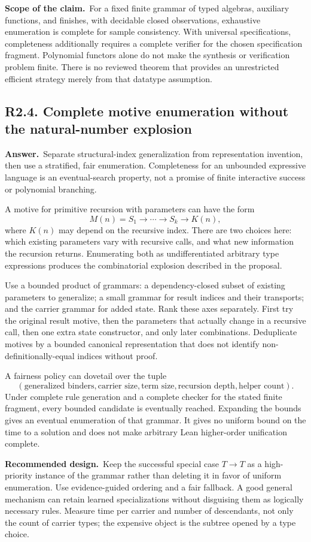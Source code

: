\documentclass[11pt,a4paper]{article}
\newcommand{\qid}[3]{\subsection{#2. #3}\label{#1}}
\newcommand{\answer}{\noindent\textbf{Answer.}\ }
\newcommand{\proposal}{\noindent\textbf{Recommended design.}\ }
\newcommand{\scope}{\noindent\textbf{Scope of the claim.}\ }
\theoremstyle{remark}
\begin{document}
\scope For a fixed finite grammar of typed algebras, auxiliary functions, and finishes, with decidable closed observations, exhaustive enumeration is complete for sample consistency. With universal specifications, completeness additionally requires a complete verifier for the chosen specification fragment. Polynomial functors alone do not make the synthesis or verification problem finite. There is no reviewed theorem that provides an unrestricted efficient strategy merely from that datatype assumption.

\qid{q24}{R2.4}{Complete motive enumeration without the natural-number explosion}
\answer Separate structural-index generalization from representation invention, then use a stratified, fair enumeration. Completeness for an unbounded expressive language is an eventual-search property, not a promise of finite interactive success or polynomial branching.

A motive for primitive recursion with parameters can have the form
\[
 M(n)=S_1\to\cdots\to S_k\to K(n),
\]
where $K(n)$ may depend on the recursive index. There are two choices here: which existing parameters vary with recursive calls, and what new information the recursion returns. Enumerating both as undifferentiated arbitrary type expressions produces the combinatorial explosion described in the proposal.

Use a bounded product of grammars: a dependency-closed subset of existing parameters to generalize; a small grammar for result indices and their transports; and the carrier grammar for added state. Rank these axes separately. First try the original result motive, then the parameters that actually change in a recursive call, then one extra state constructor, and only later combinations. Deduplicate motives by a bounded canonical representation that does not identify non-definitionally-equal indices without proof.

A fairness policy can dovetail over the tuple
\[
 (\text{generalized binders},\text{carrier size},\text{term size},
   \text{recursion depth},\text{helper count}).
\]
Under complete rule generation and a complete checker for the stated finite fragment, every bounded candidate is eventually reached. Expanding the bounds gives an eventual enumeration of that grammar. It gives no uniform bound on the time to a solution and does not make arbitrary Lean higher-order unification complete.

\proposal Keep the successful special case $T\to T$ as a high-priority instance of the grammar rather than deleting it in favor of uniform enumeration. Use evidence-guided ordering and a fair fallback. A good general mechanism can retain learned specializations without disguising them as logically necessary rules. Measure time per carrier and number of descendants, not only the count of carrier types; the expensive object is the subtree opened by a type choice.
\end{document}
